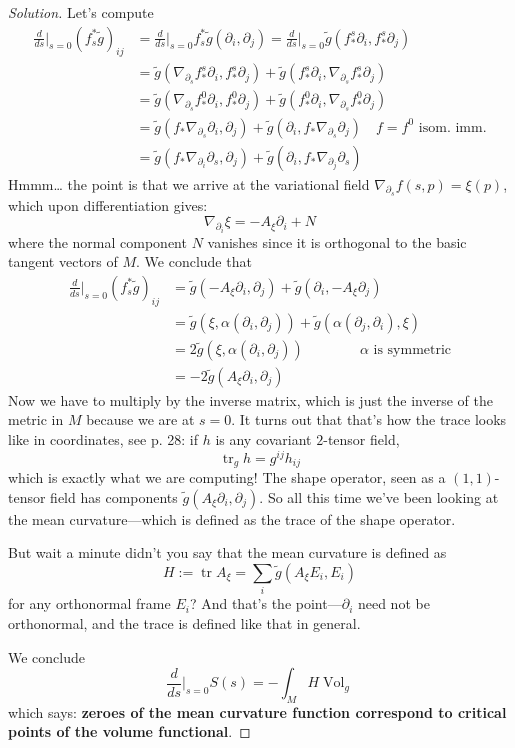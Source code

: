 \begin{proof}[Solution]
Let's compute
\begin{align*}
\frac{d}{ds}\Big|_{s=0}(f_s^*\tilde{g})_{ij}&=\frac{d}{ds}\Big|_{s=0}f_s^*\tilde{g}\left(\partial_i,\partial_j\right)=\frac{d}{ds}\Big|_{s=0}\tilde{g}(f^s_*\partial_i,f^s_*\partial_j)\\
&=\tilde{g}\left(\nabla_{\partial_s}f^s_*\partial_i,f^s_*\partial_j\right)+\tilde{g}\left(f^s_*\partial_i,\nabla_{\partial_s}f_*^s\partial_j\right)\\
&=\tilde{g}\left(\nabla_{\partial_s}f^0_*\partial_i,f_*^0\partial_j\right)+\tilde{g}\left(f^0_*\partial_i,\nabla_{\partial_s}f_*^0\partial_j\right)\\
&=\tilde{g}\left(f_*\nabla_{\partial_s}\partial_i,\partial_j\right)+\tilde{g}\left(\partial_i,f_* \nabla_{\partial_s}\partial_j\right)\quad \text{\(f=f^0\) isom. imm.}\\
&=\tilde{g}\left(f_*\nabla_{\partial_i}\partial_s,\partial_j\right)+\tilde{g}\left(\partial_i,f_* \nabla_{\partial_j}\partial_s\right)
\end{align*}
Hmmm… the point is that we arrive at the variational field \(\nabla_{\partial_s}f(s,p)=\xi(p)\), which upon differentiation gives:
\[\nabla_{\partial_i}\xi=-A_{\xi}\partial_i+N\]
where the normal component \(N\) vanishes since it is orthogonal to the basic tangent vectors of \(M\). We conclude that
\begin{align*}
\frac{d}{ds}\Big|_{s=0}(f_s^*\tilde{g})_{ij}&=\tilde{g}\left(-A_{\xi}\partial_i,\partial_j\right)+\tilde{g}\left(\partial_i,-A_{\xi}\partial_j\right)\\
&=\tilde{g}(\xi,\alpha(\partial_i,\partial_j))+\tilde{g}(\alpha(\partial_j,\partial_i),\xi)\\
&=2\tilde{g}(\xi,\alpha(\partial_i,\partial_j))\qquad\qquad \text{\(\alpha\) is symmetric}\\
&=-2\tilde{g}(A_{\xi}\partial_i,\partial_j)
\end{align*}
Now we have to multiply by the inverse matrix, which is just the inverse of the metric in \(M\) because we are at \(s=0\). It turns out that that's how the trace looks like in coordinates, see  \cite{ler} p. 28: if \(h\) is any covariant \(2\)-tensor field,
\[\operatorname{tr}_gh=g^{ij}h_{ij}\]
which is exactly what we are computing! The shape operator, seen as a \((1,1)\)-tensor field has components \(\tilde{g}(A_{\xi}\partial_i,\partial_j)\). So all this time we've been looking at the mean curvature---which is defined as the trace of the shape operator.

But wait a minute didn't you say that the mean curvature is defined as
\[H:=\operatorname{tr}A_{\xi}=\sum_i \tilde{g}(A_{\xi}E_i,E_i)\]
for any orthonormal frame \(E_i\)? And that's the point---\(\partial_i\) need not be orthonormal, and the trace is defined like that in general.

We conclude
\[\frac{d}{ds}\Big|_{s=0}S(s)=-\int_M H \operatorname{Vol}_{g}\]
which says: \textbf{zeroes of the mean curvature function correspond to critical points of the volume functional}.
\end{proof}

